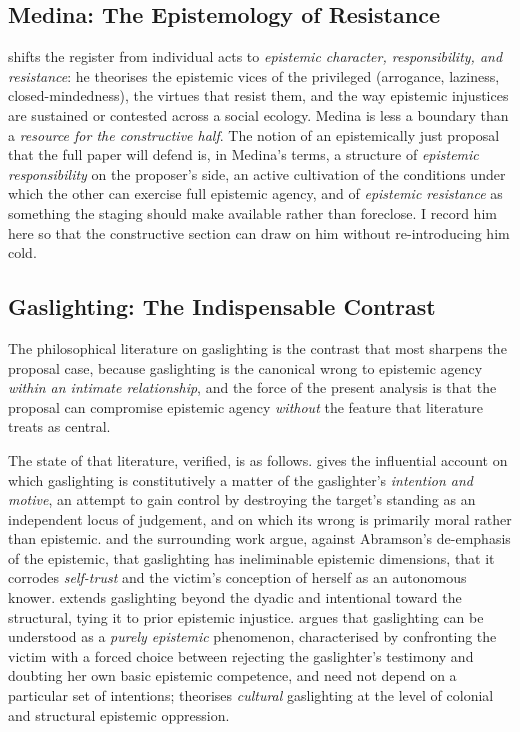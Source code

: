 \subsection{Medina: The Epistemology of Resistance}

\textcite{medina2013epistemology} shifts the register from individual acts to \emph{epistemic character, responsibility, and resistance}: he theorises the epistemic vices of the privileged (arrogance, laziness, closed-mindedness), the virtues that resist them, and the way epistemic injustices are sustained or contested across a social ecology. Medina is less a boundary than a \emph{resource for the constructive half}. The notion of an epistemically just proposal that the full paper will defend is, in Medina's terms, a structure of \emph{epistemic responsibility} on the proposer's side, an active cultivation of the conditions under which the other can exercise full epistemic agency, and of \emph{epistemic resistance} as something the staging should make available rather than foreclose. I record him here so that the constructive section can draw on him without re-introducing him cold.

\subsection{Gaslighting: The Indispensable Contrast}

The philosophical literature on gaslighting is the contrast that most sharpens the proposal case, because gaslighting is the canonical wrong to epistemic agency \emph{within an intimate relationship}, and the force of the present analysis is that the proposal can compromise epistemic agency \emph{without} the feature that literature treats as central.

The state of that literature, verified, is as follows. \textcite{abramson2014turning} gives the influential account on which gaslighting is constitutively a matter of the gaslighter's \emph{intention and motive}, an attempt to gain control by destroying the target's standing as an independent locus of judgement, and on which its wrong is primarily moral rather than epistemic. \textcite{spear2019epistemic} and the surrounding work argue, against Abramson's de-emphasis of the epistemic, that gaslighting has ineliminable epistemic dimensions, that it corrodes \emph{self-trust} and the victim's conception of herself as an autonomous knower. \textcite{stark2019gaslighting} extends gaslighting beyond the dyadic and intentional toward the structural, tying it to prior epistemic injustice. \textcite{podosky2021gaslighting} argues that gaslighting can be understood as a \emph{purely epistemic} phenomenon, characterised by confronting the victim with a forced choice between rejecting the gaslighter's testimony and doubting her own basic epistemic competence, and need not depend on a particular set of intentions; \textcite{ruiz2020cultural} theorises \emph{cultural} gaslighting at the level of colonial and structural epistemic oppression.

